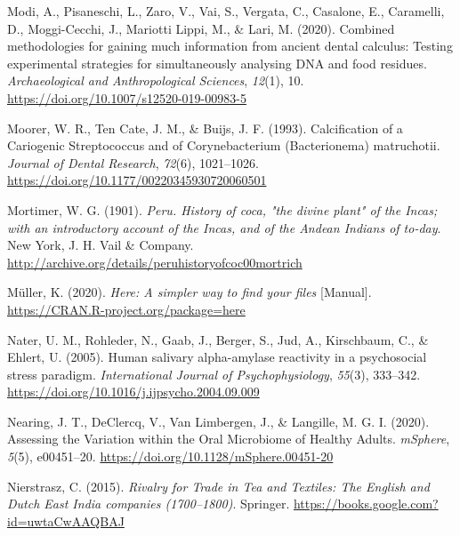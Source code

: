 \documentclass[
  letterpaper,
]{book}
\newlength{\cslhangindent}
\newlength{\cslentryspacingunit} %
\newenvironment{CSLReferences}[2] %
 {%
  \setlength{\parindent}{0pt}
  \ifodd #1
  \let\oldpar\par
  \def\par{\hangindent=\cslhangindent\oldpar}
  \fi
  \setlength{\parskip}{#2\cslentryspacingunit}
 }%
 {}
\begin{document}
\begin{CSLReferences}{1}{0}
\leavevmode{}%
Modi, A., Pisaneschi, L., Zaro, V., Vai, S., Vergata, C., Casalone, E.,
Caramelli, D., Moggi-Cecchi, J., Mariotti Lippi, M., \& Lari, M. (2020).
Combined methodologies for gaining much information from ancient dental
calculus: Testing experimental strategies for simultaneously analysing
{DNA} and food residues. \emph{Archaeological and Anthropological
Sciences}, \emph{12}(1), 10.
\url{https://doi.org/10.1007/s12520-019-00983-5}

\leavevmode{}%
Moorer, W. R., Ten Cate, J. M., \& Buijs, J. F. (1993). Calcification of
a {Cariogenic Streptococcus} and of {Corynebacterium} ({Bacterionema})
matruchotii. \emph{Journal of Dental Research}, \emph{72}(6),
1021--1026. \url{https://doi.org/10.1177/00220345930720060501}

\leavevmode{}%
Mortimer, W. G. (1901). \emph{Peru. {History} of coca, "the divine
plant" of the {Incas}; with an introductory account of the {Incas}, and
of the {Andean Indians} of to-day}. {New York, J. H. Vail \& Company}.
\url{http://archive.org/details/peruhistoryofcoc00mortrich}

\leavevmode{}%
Müller, K. (2020). \emph{Here: {A} simpler way to find your files}
{[}Manual{]}. \url{https://CRAN.R-project.org/package=here}

\leavevmode{}%
Nater, U. M., Rohleder, N., Gaab, J., Berger, S., Jud, A., Kirschbaum,
C., \& Ehlert, U. (2005). Human salivary alpha-amylase reactivity in a
psychosocial stress paradigm. \emph{International Journal of
Psychophysiology}, \emph{55}(3), 333--342.
\url{https://doi.org/10.1016/j.ijpsycho.2004.09.009}

\leavevmode{}%
Nearing, J. T., DeClercq, V., Van Limbergen, J., \& Langille, M. G. I.
(2020). Assessing the {Variation} within the {Oral Microbiome} of
{Healthy Adults}. \emph{mSphere}, \emph{5}(5), e00451--20.
\url{https://doi.org/10.1128/mSphere.00451-20}

\leavevmode{}%
Nierstrasz, C. (2015). \emph{Rivalry for {Trade} in {Tea} and
{Textiles}: {The English} and {Dutch East India} companies
(1700--1800)}. {Springer}.
\url{https://books.google.com?id=uwtaCwAAQBAJ}


\end{CSLReferences}
\end{document}
